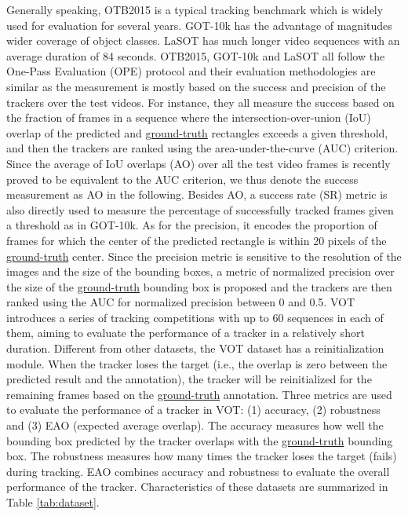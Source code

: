 \documentclass[journal]{IEEEtran}
\newcommand{\ie}{i.e.}
\begin{document}
Generally speaking, OTB2015 is a typical tracking benchmark which is widely used for evaluation for several years. GOT-10k has the advantage of magnitudes wider coverage of object classes. LaSOT has much longer video sequences with an average duration of 84 seconds. OTB2015, GOT-10k and LaSOT all follow the One-Pass Evaluation (OPE) protocol and their evaluation methodologies are similar as the measurement is mostly based on the success and precision of the trackers over the test videos. For instance, they all measure the success based on the fraction of frames in a sequence where the intersection-over-union (IoU) overlap of the predicted and \uline{ground-truth} rectangles exceeds a given threshold, and then the trackers are ranked using the area-under-the-curve (AUC) criterion. Since the average of IoU overlaps (AO) over all the test video frames is recently proved to be equivalent to the AUC criterion, we thus denote the success measurement as AO in the following. Besides AO, a success rate (SR) metric is also directly used to measure the percentage of successfully tracked frames given a threshold as in GOT-10k. As for the precision, it encodes the proportion of frames for which the center of the predicted rectangle is within 20 pixels of the \uline{ground-truth} center. Since the precision metric is sensitive to the resolution of the images and the size of the bounding boxes, a metric of normalized precision over the size of the \uline{ground-truth} bounding box is proposed and the trackers are then ranked using the AUC for normalized precision between 0 and 0.5. VOT \cite{VOT2016,VOT2018,VOT2019} introduces a series of tracking competitions with up to 60 sequences in each of them, aiming to evaluate the performance of a tracker in a relatively short duration. Different from other datasets, the VOT dataset has a reinitialization module. When the tracker loses the target (\ie, the overlap is zero between the predicted result and the annotation), the tracker will be reinitialized for the remaining frames based on the \uline{ground-truth} annotation. Three metrics are used to evaluate the performance of a tracker in VOT: (1) accuracy, (2) robustness and (3) EAO (expected average overlap). The accuracy measures how well the bounding box predicted by the tracker overlaps with the \uline{ground-truth} bounding box. The robustness measures how many times the tracker loses the target (fails) during tracking. EAO combines accuracy and robustness to evaluate the overall performance of the tracker. Characteristics of these datasets are summarized in Table \ref{tab:dataset}.
\end{document}
